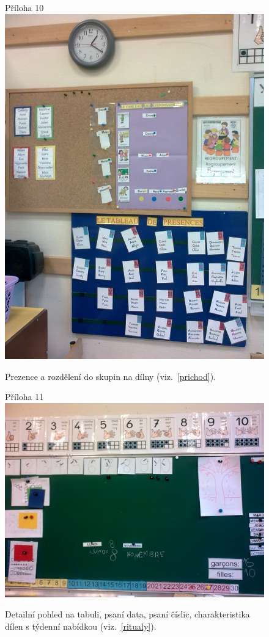 	\begin{figure}[tb]
		\centering
		Příloha 10\\
		\includegraphics[height=0.35\textheight]{./fotky/Obr10.jpg}
		\caption{
			Prezence a rozdělení do skupin na dílny (viz.~\ref{prichod}).
		}
		\label{Obr10}
	\end{figure}

	\begin{figure}[tb]
		\centering
		Příloha 11\\
		\includegraphics[height=0.35\textheight]{./fotky/Obr11.jpg}
		\caption{
			Detailní pohled na tabuli, psaní data, psaní číslic, charakteristika dílen s týdenní nabídkou  (viz.~\ref{ritualy}).
		}
		\label{Obr11}
	\end{figure}

